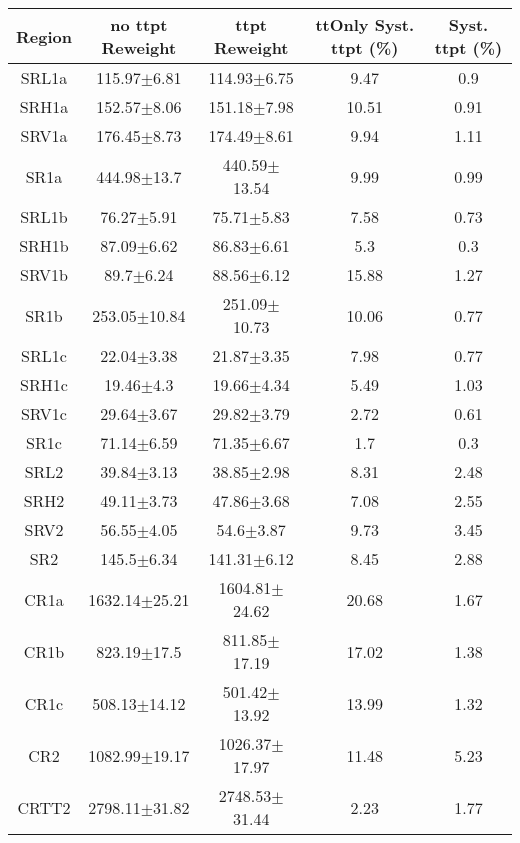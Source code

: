 \documentclass[12pt]{paper}
\begin{document}
\begin{table}[ht]\begin{center}\resizebox{\textwidth}{!}
{\begin{tabular}{c|cccc}
    Region & no ttpt Reweight & ttpt Reweight & ttOnly Syst. ttpt (\%) & Syst. ttpt (\%)\\ 
\hline
SRL1a & 115.97$\pm$6.81 & 114.93$\pm$6.75 & 9.47 & 0.9\\ 
SRH1a & 152.57$\pm$8.06 & 151.18$\pm$7.98 & 10.51 & 0.91\\ 
SRV1a & 176.45$\pm$8.73 & 174.49$\pm$8.61 & 9.94 & 1.11\\ 
\hline
SR1a & 444.98$\pm$13.7 & 440.59$\pm$13.54 & 9.99 & 0.99\\ 
\hline
SRL1b & 76.27$\pm$5.91 & 75.71$\pm$5.83 & 7.58 & 0.73\\ 
SRH1b & 87.09$\pm$6.62 & 86.83$\pm$6.61 & 5.3 & 0.3\\ 
SRV1b & 89.7$\pm$6.24 & 88.56$\pm$6.12 & 15.88 & 1.27\\ 
\hline
SR1b & 253.05$\pm$10.84 & 251.09$\pm$10.73 & 10.06 & 0.77\\ 
\hline
SRL1c & 22.04$\pm$3.38 & 21.87$\pm$3.35 & 7.98 & 0.77\\ 
SRH1c & 19.46$\pm$4.3 & 19.66$\pm$4.34 & 5.49 & 1.03\\ 
SRV1c & 29.64$\pm$3.67 & 29.82$\pm$3.79 & 2.72 & 0.61\\ 
\hline
SR1c & 71.14$\pm$6.59 & 71.35$\pm$6.67 & 1.7 & 0.3\\ 
\hline
SRL2 & 39.84$\pm$3.13 & 38.85$\pm$2.98 & 8.31 & 2.48\\ 
SRH2 & 49.11$\pm$3.73 & 47.86$\pm$3.68 & 7.08 & 2.55\\ 
SRV2 & 56.55$\pm$4.05 & 54.6$\pm$3.87 & 9.73 & 3.45\\ 
\hline
SR2 & 145.5$\pm$6.34 & 141.31$\pm$6.12 & 8.45 & 2.88\\ 
\hline
\hline
CR1a & 1632.14$\pm$25.21 & 1604.81$\pm$24.62 & 20.68 & 1.67\\ 
CR1b & 823.19$\pm$17.5 & 811.85$\pm$17.19 & 17.02 & 1.38\\ 
CR1c & 508.13$\pm$14.12 & 501.42$\pm$13.92 & 13.99 & 1.32\\ 
CR2 & 1082.99$\pm$19.17 & 1026.37$\pm$17.97 & 11.48 & 5.23\\ 
CRTT2 & 2798.11$\pm$31.82 & 2748.53$\pm$31.44 & 2.23 & 1.77\\ 

\end{tabular}}
\end{center}\caption*{}\end{table}
\end{document}
